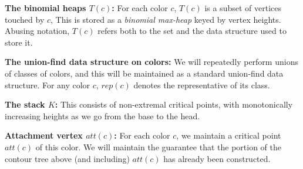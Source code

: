 \documentclass[11pt]{article}
\newcommand{\ignore}[1]{}
\theoremstyle{definition}
\newcommand{\col}{col}
\newcommand{\h}{att}
\newcommand{\mcol}{mcol}
\newcommand{\rep}{rep}
\newcommand{\st}{K}
\newcommand{\touch}{T}
\begin{document}
\medskip
\noindent
{\bf The binomial heaps $\touch(c)$:} For each color $c$, $\touch(c)$ is a subset of vertices touched by $c$,
This is stored as a \emph{binomial max-heap} keyed by vertex heights. Abusing notation, $\touch(c)$ refers
both to the set and the data structure used to store it.

%

\medskip
\noindent
{\bf The union-find data structure on colors:} We will repeatedly perform unions
of classes of colors, and this will be maintained as a standard union-find data structure.
For any color $c$, $\rep(c)$ denotes the representative of its class. 

\medskip
\noindent
{\bf The stack $\st$:} This consists of non-extremal critical points, with monotonically increasing
heights as we go from the base to the head.
\ignore{
Each point $x \in \st$ has an associated subset of $\col(x)$, denoted $\mcol(x)$.
Both $\mcol(x)$ and its complement are stored as hash table. So lookups, inserts, and deletes
are in these sets are all constant time operations. The stack is guaranteed to satisfy 
the following invariants.
\begin{asparaitem}
	\item For every $x \in \st$: For every $c \in \mcol(x)$, $x$ is the highest element
	in $T(c)$. Furthermore, $c = \rep(c)$.
	\item Consider $x, y \in \st$ such that $y$ was pushed on $x$. There exists $c \in \col(x) \setminus
	\mcol(x)$ such that $x$ is not highest in $T(c)$ but $y$ is highest in $T(c)$.
\end{asparaitem}
}

\medskip
\noindent
{\bf Attachment vertex $\h(c)$:} For each color $c$, we maintain a critical point $\h(c)$ of this color.
We will maintain the guarantee that the portion of the contour tree above (and including) $\h(c)$ has already been constructed.
\end{document}
